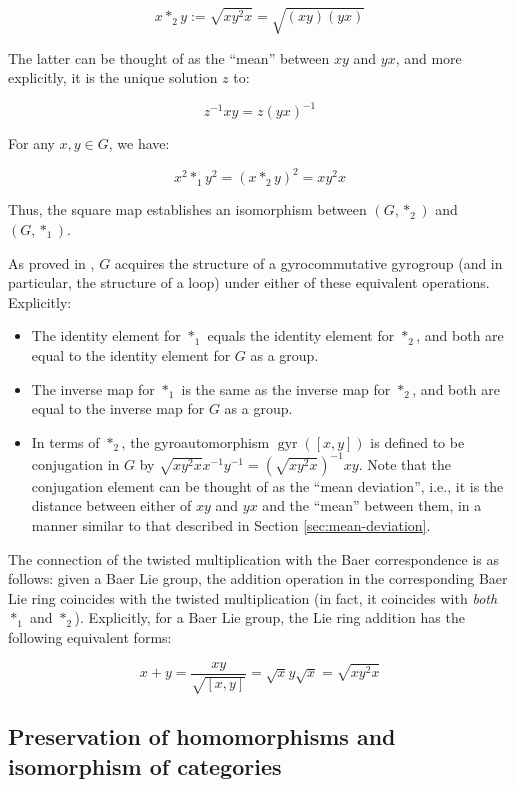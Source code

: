 \documentclass{ucetd}
\begin{document}
$$x *_2 y := \sqrt{xy^2x} = \sqrt{(xy)(yx)}$$

The latter can be thought of as the ``mean'' between $xy$ and $yx$,
and more explicitly, it is the unique solution $z$ to:

$$z^{-1}xy = z(yx)^{-1}$$

For any $x,y \in G$, we have:

$$x^2 *_1 y^2  = (x *_2 y)^2 = xy^2x$$

Thus, the square map establishes an isomorphism between $(G,*_2)$ and
$(G,*_1)$.

As proved in \cite{Foguelinv}, $G$ acquires the
structure of a gyrocommutative gyrogroup (and in particular, the
structure of a loop) under either of these equivalent
operations. Explicitly:

\begin{itemize}
\item The identity element for $*_1$ equals the identity element for
  $*_2$, and both are equal to the identity element for $G$ as a group.
\item The inverse map for $*_1$ is the same as the inverse map for
  $*_2$, and both are equal to the inverse map for $G$ as a group.
\item In terms of $*_2$, the gyroautomorphism
  $\operatorname{gyr}([x,y])$ is defined to be conjugation in $G$ by
  $\sqrt{xy^2x}x^{-1}y^{-1} = (\sqrt{xy^2x})^{-1}xy$. Note that the
  conjugation element can be thought of as the ``mean deviation'',
  i.e., it is the distance between either of $xy$ and $yx$ and the
  ``mean'' between them, in a manner similar to that described in
  Section \ref{sec:mean-deviation}.
\end{itemize}

The connection of the twisted multiplication with the Baer
correspondence is as follows: given a Baer Lie group, the addition
operation in the corresponding Baer Lie ring coincides with the
twisted multiplication (in fact, it coincides with {\em both} $*_1$
and $*_2$). Explicitly, for a Baer Lie group, the Lie ring addition
has the following equivalent forms:

$$x + y = \frac{xy}{\sqrt{[x,y]}} = \sqrt{x}y\sqrt{x} = \sqrt{xy^2x}$$

\subsection{Preservation of homomorphisms and isomorphism of categories}\label{sec:baer-correspondence-homomorphism-preservation}
\end{document}
